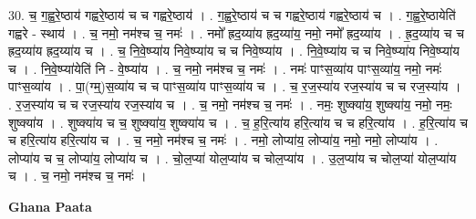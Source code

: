 \documentclass[17pt]{extarticle}
\begin{document}
30. च॒ ग॒ह्व॒रे॒ष्ठाय॑ गह्वरे॒ष्ठाय॑ च च गह्वरे॒ष्ठाय॑ । . ग॒ह्व॒रे॒ष्ठाय॑ च च गह्वरे॒ष्ठाय॑ गह्वरे॒ष्ठाय॑ च । . ग॒ह्व॒रे॒ष्ठायेति॑ गह्वरे - स्थाय॑ । . च॒ नमो॒ नम॑श्च च॒ नमः॑ । . नमो᳚ ह्रद॒य्या॑य ह्रद॒य्या॑य॒ नमो॒ नमो᳚ ह्रद॒य्या॑य । . ह्र॒द॒य्या॑य च च ह्रद॒य्या॑य ह्रद॒य्या॑य च । . च॒ नि॒वे॒ष्प्या॑य निवे॒ष्प्या॑य च च निवे॒ष्प्या॑य । . नि॒वे॒ष्प्या॑य च च निवे॒ष्प्या॑य निवे॒ष्प्या॑य च । . नि॒वे॒ष्प्या॑येति॑ नि - वे॒ष्प्या॑य । . च॒ नमो॒ नम॑श्च च॒ नमः॑ । . नमः॑ पाꣳस॒व्या॑य पाꣳस॒व्या॑य॒ नमो॒ नमः॑ पाꣳस॒व्या॑य । . पा॒(ग्म्॒)स॒व्या॑य च च पाꣳस॒व्या॑य पाꣳस॒व्या॑य च । . च॒ र॒ज॒स्या॑य रज॒स्या॑य च च रज॒स्या॑य । . र॒ज॒स्या॑य च च रज॒स्या॑य रज॒स्या॑य च । . च॒ नमो॒ नम॑श्च च॒ नमः॑ । . नमः॒ शुष्क्या॑य॒ शुष्क्या॑य॒ नमो॒ नमः॒ शुष्क्या॑य । . शुष्क्या॑य च च॒ शुष्क्या॑य॒ शुष्क्या॑य च । . च॒ ह॒रि॒त्या॑य हरि॒त्या॑य च च हरि॒त्या॑य । . ह॒रि॒त्या॑य च च हरि॒त्या॑य हरि॒त्या॑य च । . च॒ नमो॒ नम॑श्च च॒ नमः॑ । . नमो॒ लोप्या॑य॒ लोप्या॑य॒ नमो॒ नमो॒ लोप्या॑य । . लोप्या॑य च च॒ लोप्या॑य॒ लोप्या॑य च । . चो॒ल॒प्या॑ योल॒प्या॑य च चोल॒प्या॑य । . उ॒ल॒प्या॑य च चोल॒प्या॑ योल॒प्या॑य च । . च॒ नमो॒ नम॑श्च च॒ नमः॑ । \newline

\textbf{Ghana Paata } \newline
\end{document}
